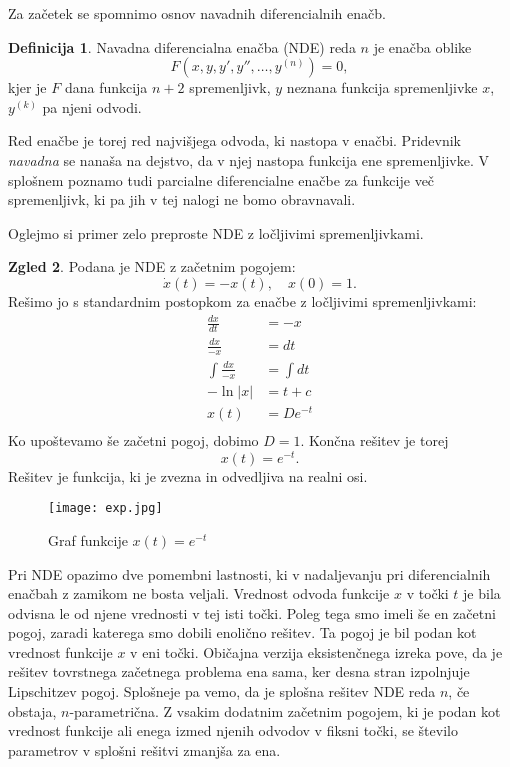 \documentclass[12pt,a4paper]{amsart}
\theoremstyle{definition} %
\newtheorem{definicija}{Definicija}[section]
\newtheorem{zgled}[definicija]{Zgled}
\theoremstyle{plain} %
\begin{document}
Za začetek se spomnimo osnov navadnih diferencialnih enačb.

\begin{definicija}
    Navadna diferencialna enačba (NDE) reda $n$ je enačba oblike
    \[F(x,y,y',y'',\dots,y^{(n)})=0,\]
    kjer je $F$ dana funkcija $n+2$ spremenljivk, $y$ neznana funkcija spremenljivke $x$, $y^{(k)}$ pa njeni
    odvodi.
\end{definicija}
Red enačbe je torej red najvišjega odvoda, ki nastopa v enačbi. Pridevnik \textit{navadna} se nanaša na dejstvo,
da v njej nastopa funkcija ene spremenljivke. V splošnem poznamo 
tudi parcialne diferencialne enačbe za funkcije več spremenljivk, ki pa jih v tej nalogi ne bomo obravnavali.

Oglejmo si primer zelo preproste NDE z ločljivimi spremenljivkami.

\begin{zgled}
    Podana je NDE z začetnim pogojem:
    \[\dot{x}(t) =-x(t),\quad x(0)=1.\]
    Rešimo jo s standardnim postopkom za enačbe z ločljivimi spremenljivkami:
    \begin{equation*}
    \begin{split}
      \frac{dx}{dt} & =-x \\
      \frac{dx}{-x} & =dt \\
      \int \frac{dx}{-x} & =\int dt \\
     -\ln|x| & =t+c \\
      x(t) & =De^{-t} \\
    \end{split}
    \end{equation*}
Ko upoštevamo še začetni pogoj, dobimo $D=1$. Končna rešitev je torej \[x(t)=e^{-t}.\]
Rešitev je funkcija, ki je zvezna in odvedljiva na realni osi.
\end{zgled}


\begin{figure}[h]
    \texttt{[image: exp.jpg]}
    \caption{Graf funkcije $x(t)=e^{-t}$}
\end{figure}


Pri NDE opazimo dve pomembni lastnosti, ki v nadaljevanju pri diferencialnih enačbah z zamikom ne bosta veljali. 
Vrednost odvoda funkcije $x$ v točki $t$ je bila odvisna le od njene vrednosti v tej isti točki. Poleg tega smo 
imeli še en začetni pogoj, zaradi katerega smo dobili enolično rešitev. Ta pogoj je bil podan kot vrednost funkcije
$x$ v eni točki. Običajna verzija eksistenčnega izreka pove, da je rešitev tovrstnega začetnega problema
ena sama, ker desna stran izpolnjuje Lipschitzev pogoj. Splošneje pa vemo, da
je splošna rešitev NDE reda $n$, če obstaja, $n$-parametrična.
Z vsakim dodatnim začetnim pogojem, ki je podan kot vrednost funkcije ali enega izmed njenih odvodov v fiksni točki,
se število parametrov v splošni rešitvi zmanjša za ena.
\end{document}
